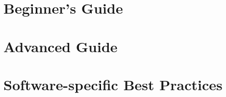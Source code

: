 \documentclass[11pt,a4paper,twoside,openany]{book}
\begin{document}
\pagestyle{empty}



\glsaddall
\glstoctrue
\renewcommand*{\glsclearpage}{}
\printglossaries

\printindex


\tableofcontents

\part{Beginner's Guide}

\pagestyle{vsc}

%






















\part{Advanced Guide}

%







\ifgent

\fi
\ifbrussel

\fi








\ifgent
\part{Software-specific Best Practices}




\fi

\appendix






\end{document}
